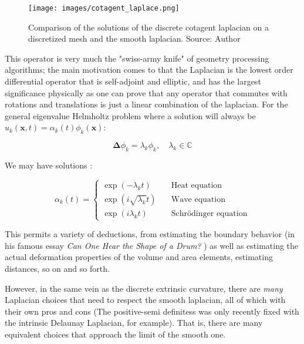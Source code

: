 \spa

\begin{figure}[h]
    \centering
\texttt{[image: images/cotagent\_laplace.png]}
    \caption{Comparison of the solutions of the discrete
    cotagent laplacian on a discretized mesh and the smooth
    laplacian. Source: Author}
    \label{fig:two-vertical-images}
\end{figure}

This operator is very much the "swiss-army knife"
\cite{laplacian2} of geometry processing algorithms; the
main motivation comes to that the Laplacian is the lowest
order differential operator that is self-adjoint and elliptic,
and has the largest significance physically as one can
prove that any operator that commutes with rotations
and translations is just a linear combination of the
laplacian. For the general eigenvalue Helmholtz problem
where a solution will always be $u_k(\mathbf{x},t) = \alpha_k(t) \phi_k(\mathbf{x})$:

\begin{equation*}
    \mathbf{\Delta} \phi_k = \lambda_k \phi_k, \quad \lambda_k \in \mathbb{C}
\end{equation*}

We may have solutions \cite{canzani2013analysis_laplacian}:

\begin{equation*}
    \alpha_k(t) = \begin{cases}
        \exp(-\lambda_k t) \quad            &\text{Heat equation}\\
        \exp(i \sqrt{\lambda_k} t) \quad    &\text{Wave equation}\\
        \exp(i \lambda_k t) \quad           &\text{Schrödinger equation}
    \end{cases}
\end{equation*}

This permits a variety of deductions, from estimating the boundary
behavior (in his famous essay \textit{Can One Hear the Shape of a Drum?} \cite{Kac1966drum})
as well as estimating the actual deformation properties
of the volume and area elements, estimating distances,
so on and so forth.

\spa

However, in the same vein as the discrete extrinsic curvature,
there are \textit{many} Laplacian choices that need to respect
the smooth laplacian, all of which with their own pros and cons
\cite{laplacian1} (The positive-semi definitess was only recently
fixed with the intrinsic Delaunay Laplacian, for example). That is,
there are many equivalent choices that approach the limit of the smooth
one. 

